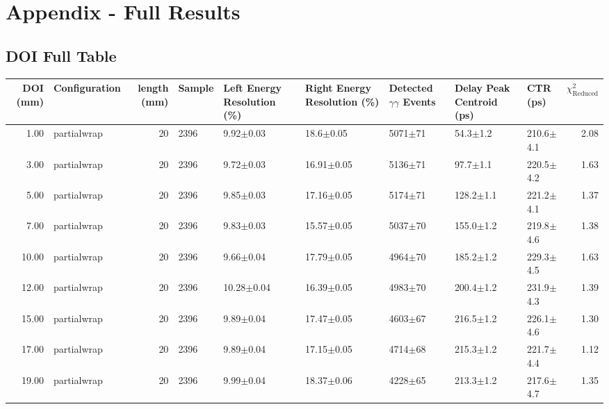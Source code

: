 \section*{Appendix - Full Results}

\subsection{DOI Full Table}
\begin{table}
\label{\caption{tab:FullDOIResults} Full results for Depth of Interaction Measurements}
\begin{tabular}{rlrllllllr}
\hline
DOI (mm) & Configuration &  length (mm) & Sample & Left Energy Resolution (\%) & Right Energy Resolution (\%) & Detected $\gamma\gamma$ Events & Delay Peak Centroid (ps) & CTR (ps) &  $\chi^2_\text{Reduced}$ \\
\hline
      1.00 &   partialwrap &      20 &    2396 &        9.92$\pm$0.03 &    18.6$\pm$0.05 &  5071$\pm$71 &    54.3$\pm$1.2 &   210.6$\pm$4.1 &        2.08 \\
      3.00 &   partialwrap &      20 &    2396 &        9.72$\pm$0.03 &   16.91$\pm$0.05 &  5136$\pm$71 &    97.7$\pm$1.1 &   220.5$\pm$4.2 &        1.63 \\
      5.00 &   partialwrap &      20 &    2396 &        9.85$\pm$0.03 &   17.16$\pm$0.05 &  5174$\pm$71 &   128.2$\pm$1.1 &   221.2$\pm$4.1 &        1.37 \\
      7.00 &   partialwrap &      20 &    2396 &        9.83$\pm$0.03 &   15.57$\pm$0.05 &  5037$\pm$70 &   155.0$\pm$1.2 &   219.8$\pm$4.6 &        1.38 \\
     10.00 &   partialwrap &      20 &    2396 &        9.66$\pm$0.04 &   17.79$\pm$0.05 &  4964$\pm$70 &   185.2$\pm$1.2 &   229.3$\pm$4.5 &        1.63 \\
     12.00 &   partialwrap &      20 &    2396 &       10.28$\pm$0.04 &   16.39$\pm$0.05 &  4983$\pm$70 &   200.4$\pm$1.2 &   231.9$\pm$4.3 &        1.39 \\
     15.00 &   partialwrap &      20 &    2396 &        9.89$\pm$0.04 &   17.47$\pm$0.05 &  4603$\pm$67 &   216.5$\pm$1.2 &   226.1$\pm$4.6 &        1.30 \\
     17.00 &   partialwrap &      20 &    2396 &        9.89$\pm$0.04 &   17.15$\pm$0.05 &  4714$\pm$68 &   215.3$\pm$1.2 &   221.7$\pm$4.4 &        1.12 \\
     19.00 &   partialwrap &      20 &    2396 &        9.99$\pm$0.04 &   18.37$\pm$0.06 &  4228$\pm$65 &   213.3$\pm$1.2 &   217.6$\pm$4.7 &        1.35 \\

\end{tabular}
\end{table}
